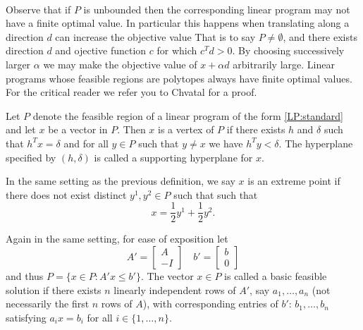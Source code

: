 \paragraph{}Observe that if $P$ is unbounded then the corresponding linear program may not have a finite optimal value. In particular this happens when translating along a direction $d$ can increase the objective value That is to say $P \neq \emptyset$, and there exists direction $d$ and ojective function $c$ for which $c^Td >0$. By choosing successively larger $\alpha$ we may make the objective value of $x + \alpha d$ arbitrarily large. Linear programs whose feasible regions are polytopes always have finite optimal values. For the critical reader we refer you to Chvatal \cite{chvatal1983linear} for a proof.
\begin{definition}
Let $P$ denote the feasible region of a linear program of the form \ref{LP:standard} and let $x$ be a vector in $P$. Then $x$ is a vertex of $P$ if there exists $h$ and $\delta$ such that $h^Tx = \delta$ and for all $y \in P$
such that $y \neq x$ we have $h^Ty < \delta$. The hyperplane specified by $(h,\delta)$ is called a supporting hyperplane for $x$.
\end{definition}
\begin{definition} In the same setting as the previous definition, we say $x$ is an extreme point if there does not exist distinct $y^1, y^2 \in P$ such that such that 
$$ x = \frac{1}{2} y^1 + \frac{1}{2}y^2.$$
\end{definition}
\begin{definition}
Again in the same setting, for ease of exposition let \begin{equation}A' = \begin{bmatrix} A \\ -I \end{bmatrix} \quad b' = \begin{bmatrix} b \\ 0 \end{bmatrix}\label{LP:augmented}\end{equation} and thus $P = \{x\in P : A'x \leq b'\}$. The vector $x\in P$ is called a basic feasible solution if there exists $n$ linearly independent rows of $A'$, say $a_1, \dots, a_n$ (not necessarily the first $n$ rows of $A$), with corresponding entries of $b'$: $b_1, \dots, b_n$ satisfying $a_i x = b_i$ for all $i\in \{1,\dots, n\}$.
\end{definition}
